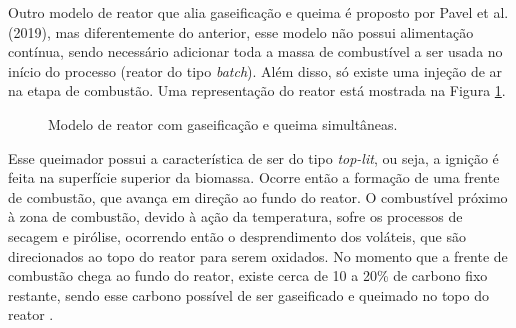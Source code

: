 Outro modelo de reator que alia gaseificação e queima é proposto por Pavel et al. (2019), mas diferentemente do anterior, esse modelo não possui alimentação contínua, sendo necessário adicionar toda a massa de combustível a ser usada no início do processo (reator do tipo \textit{batch}). Além disso, só existe uma injeção de ar na etapa de combustão. Uma representação do reator está mostrada na Figura \ref{fig:pavel}.

\begin{figure}[!ht]
	\centering
	\caption{Modelo de reator com gaseificação e queima simultâneas.}
	\label{fig:pavel}
\end{figure}

Esse queimador possui a característica de ser do tipo \textit{top-lit}, ou seja, a ignição é feita na superfície superior da biomassa. Ocorre então a formação de uma frente de combustão, que avança em direção ao fundo do reator. O combustível próximo à zona de combustão, devido à ação da temperatura, sofre os processos de secagem e pirólise, ocorrendo então o desprendimento dos voláteis, que são direcionados ao topo do reator para serem oxidados. No momento que a frente de combustão chega ao fundo do reator, existe cerca de 10 a 20\% de carbono fixo restante, sendo esse carbono possível de ser gaseificado e queimado no topo do reator \cite{Pavel2019}.

